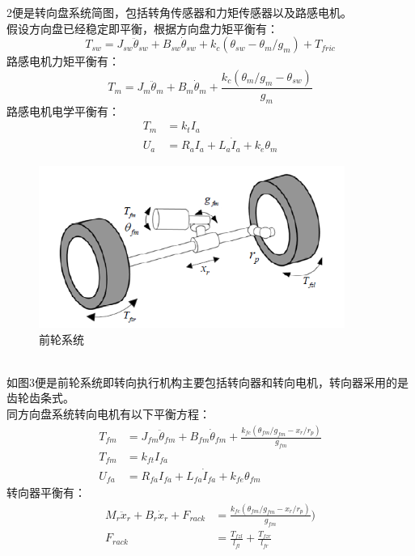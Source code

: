 \documentclass[a4paper,12pt,UTF8]{ctexart}
\begin{document}
 2便是转向盘系统简图，包括转角传感器和力矩传感器以及路感电机。\\
 \indent 假设方向盘已经稳定即平衡，根据方向盘力矩平衡有：\\
\begin{equation}
  T_{sw}=J_{sw} \ddot{\theta}_{sw}+B_{sw} \dot{\theta}_{sw}+k_c(\theta_{sw}-\theta_m/g_m)+T_{fric}
\end{equation}
\indent 路感电机力矩平衡有：\\
\begin{equation}
  T_m=J_m \ddot{\theta}_m+B_m \dot{\theta}_m+\frac{k_c(\theta_m / g_m-\theta_{sw})}{g_m}
\end{equation}
\indent 路感电机电学平衡有：\\
\begin{align}
 T_m&=k_t I_a\\
 U_a&=R_a I_a+L_a \dot{I}_a+k_e \theta_m
\end{align}
\begin{figure}[htbp]
  \centering
  \includegraphics[width=10cm]{3.png}
  \caption{前轮系统}
\end{figure}\\
\indent 如图3便是前轮系统即转向执行机构主要包括转向器和转向电机，转向器采用的是齿轮齿条式。\\
\indent 同方向盘系统转向电机有以下平衡方程：\\
\begin{align}
  T_{fm} & =J_{fm}\ddot{\theta}_{fm}+B_{fm}\dot{\theta}_{fm}+\frac{k_{fc}(\theta_{fm}/g_{fm}-x_r/r_p)}{g_{fm}}\\
  T_{fm} & =k_{ft} I_{fa} \\
  U_{fa} & =R_{fa} I_{fa}+L_{fa} \dot{I}_{fa}+k_{fe} \theta _{fm}
\end{align}
\indent 转向器平衡有：\\
\begin{align}
  M_r \ddot{x}_r+B_r \dot{x}_r+F_{rack} &= \frac{k_{fc}(\theta _{fm}/g_{fm}-x_r/r_p)}{g_{fm}}) \\
  F_{rack} &= \frac{T_{fzl}}{l_{fl}}+\frac{T_{fzr}}{l_{fr}}
\end{align}\\
\end{document}
